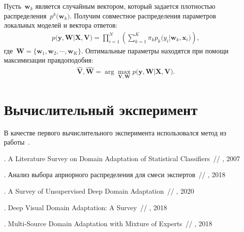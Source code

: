 \documentclass[12pt, twoside]{article}
\begin{document}
Пусть~$\mathbf{w}_k$ является случайным вектором, который задается плотностью распределения~$p^{k}\bigr(\mathbf{w}_k\bigr)$. Получим совместное распределения параметров локальных моделей и вектора ответов:
\[
\label{eq:st:3}
\begin{aligned}
p\bigr(\mathbf{y}, \mathbf{W}|\mathbf{X}, \mathbf{V}\bigr) = \prod_{i=1}^{N}\left(\sum_{k=1}^{K}\pi_{k}p_{k}\bigr(y_i|\mathbf{w}_k, \mathbf{x}_i\bigr)\right),
\end{aligned}
\]
где~$\mathbf{W} = \bigr\{\mathbf{w}_1, \mathbf{w}_2, \cdots, \mathbf{w}_K\bigr\}.$
Оптимальные параметры находятся при помощи максимизации правдоподобия:
\[
\label{eq:st:4}
\begin{aligned}
\hat{\mathbf{V}}, \hat{ \mathbf{W}} = \arg\max_{\mathbf{V}, \mathbf{W}} p\bigr(\mathbf{y},  \mathbf{W}|\mathbf{X}, \mathbf{V}\bigr).
\end{aligned}
\]

\section{Вычислительный эксперимент}
В качестве первого вычислительного эксперимента использовался метод из работы~\cite{article5}.


\begin{thebibliography}{99}


    .
   A Literature Survey on Domain Adaptation of Statistical Classifiers~//
    , 2007 %
    
    .
   Анализ выбора априорного распределения для смеси экспертов~//
    , 2018 %

    .
   A Survey of Unsupervised Deep Domain Adaptation~//
    , 2020
    
    .
   Deep Visual Domain Adaptation: A Survey~//
    , 2018
    
    .
   Multi-Source Domain Adaptation with Mixture of Experts~//
    , 2018
 
 	
\end{thebibliography}

\end{document}
